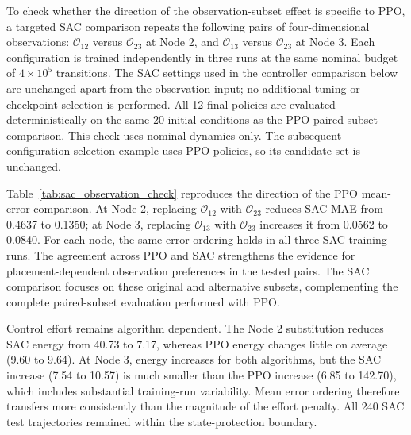 To check whether the direction of the observation-subset effect is specific to PPO, a targeted SAC comparison repeats the following pairs of four-dimensional observations: $\mathcal O_{12}$ versus $\mathcal O_{23}$ at Node 2, and $\mathcal O_{13}$ versus $\mathcal O_{23}$ at Node 3. Each configuration is trained independently in three runs at the same nominal budget of $4\times10^5$ transitions. The SAC settings used in the controller comparison below are unchanged apart from the observation input; no additional tuning or checkpoint selection is performed. All 12 final policies are evaluated deterministically on the same 20 initial conditions as the PPO paired-subset comparison. This check uses nominal dynamics only. The subsequent configuration-selection example uses PPO policies, so its candidate set is unchanged.



Table~\ref{tab:sac_observation_check} reproduces the direction of the PPO mean-error comparison. At Node 2, replacing $\mathcal O_{12}$ with $\mathcal O_{23}$ reduces SAC MAE from 0.4637 to 0.1350; at Node 3, replacing $\mathcal O_{13}$ with $\mathcal O_{23}$ increases it from 0.0562 to 0.0840. For each node, the same error ordering holds in all three SAC training runs. The agreement across PPO and SAC strengthens the evidence for placement-dependent observation preferences in the tested pairs. The SAC comparison focuses on these original and alternative subsets, complementing the complete paired-subset evaluation performed with PPO.

Control effort remains algorithm dependent. The Node 2 substitution reduces SAC energy from 40.73 to 7.17, whereas PPO energy changes little on average (9.60 to 9.64). At Node 3, energy increases for both algorithms, but the SAC increase (7.54 to 10.57) is much smaller than the PPO increase (6.85 to 142.70), which includes substantial training-run variability. Mean error ordering therefore transfers more consistently than the magnitude of the effort penalty. All 240 SAC test trajectories remained within the state-protection boundary.
